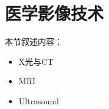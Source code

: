 \section{医学影像技术}
\label{sec2-2}

本节叙述内容：
\begin{itemize}
  \item X光与CT \cite{Orosco2013Review}
  \item MRI
  \item Ultrasound
\end{itemize}